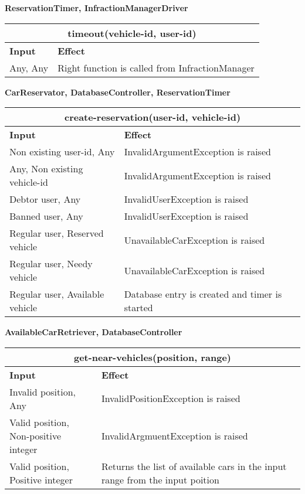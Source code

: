 \textbf{ReservationTimer, InfractionManagerDriver} \\
\begin{tabular}{|p{5cm}|p{7cm}|}
\hline
\multicolumn{2}{|c|}{timeout(vehicle-id, user-id)} \\
\hline
\textbf{Input} & \textbf{Effect} \\

\hline
Any, Any & Right function is called from InfractionManager \\
\hline
\end{tabular}


\textbf{CarReservator, DatabaseController, ReservationTimer} \\
\begin{tabular}{|p{5cm}|p{7cm}|}
\hline
\multicolumn{2}{|c|}{create-reservation(user-id, vehicle-id)} \\
\hline
\textbf{Input} & \textbf{Effect} \\

\hline
Non existing user-id, Any & InvalidArgumentException is raised \\

\hline
Any, Non existing vehicle-id & InvalidArgumentException is raised \\

\hline
Debtor user, Any & InvalidUserException is raised \\

\hline
Banned user, Any & InvalidUserException is raised \\

\hline
Regular user, Reserved vehicle & UnavailableCarException is raised \\

\hline
Regular user, Needy vehicle & UnavailableCarException is raised \\

\hline
Regular user, Available vehicle & Database entry is created and timer is started \\
\hline
\end{tabular}

\textbf{AvailableCarRetriever, DatabaseController} \\
\begin{tabular}{|p{5cm}|p{7cm}|}
\hline
\multicolumn{2}{|c|}{get-near-vehicles(position, range)} \\
\hline
\textbf{Input} & \textbf{Effect} \\

\hline
Invalid position, Any & InvalidPositionException is raised \\

\hline
Valid position, Non-positive integer & InvalidArgmuentException is raised \\

\hline
Valid position, Positive integer & Returns the list of available cars in the input range from the input poition \\
\hline
\end{tabular}
